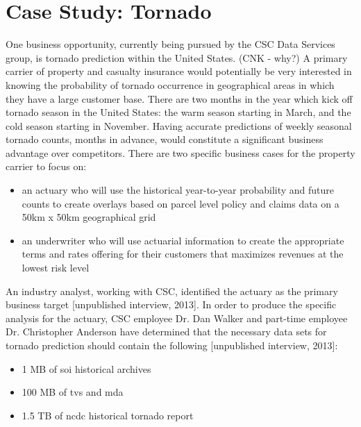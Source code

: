 

\section{Case Study: Tornado}
One business opportunity, currently being pursued by the CSC Data Services group, is tornado prediction within the United States. (CNK - why?) A primary carrier of property and casualty insurance would potentially be very interested in knowing the probability of tornado occurrence in geographical areas in which they have a large customer base. There are two months in the year which kick off tornado season in the United States: the warm season starting in March, and the cold season starting in November. Having accurate predictions of weekly seasonal tornado counts, months in advance, would constitute a significant business advantage over competitors. There are two specific business cases for the property carrier to focus on:
\begin{itemize}
    \item an actuary who will use the historical year-to-year probability and future counts to create overlays based on parcel level policy and claims data on a 50km x 50km geographical grid
    \item an underwriter who will use actuarial information to create the appropriate terms and rates offering for their customers that maximizes revenues at the lowest risk level
\end{itemize}
An industry analyst, working with CSC, identified the actuary as the primary business target [unpublished interview, 2013]. In order to produce the specific analysis for the actuary, CSC employee Dr. Dan Walker and part-time employee Dr. Christopher Anderson have determined that the necessary data sets for tornado prediction should contain the following [unpublished interview, 2013]:
\begin{itemize}
    \item 1 MB of \gls{soi} historical archives \cite{bom}
    \item 100 MB of \gls{tvs} and \gls{mda} \cite{hdss}
    \item 1.5 TB of \gls{ncdc} historical tornado report \cite{ncdc}
\end{itemize}
